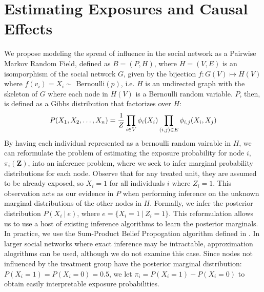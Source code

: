 \documentclass{article}
\begin{document}
\section{Estimating Exposures and Causal Effects}

We propose modeling the spread of influence in the social network as a Pairwise Markov Random Field, defined as $B = (P, H)$, where $H = (V, E)$ is an isomporphism of the social network $G$, given by the bijection $f: G(V) \mapsto H(V)$ where $f(v_i) = X_i \sim $ Bernoulli$(p)$, i.e. $H$ is an undirected graph with the skeleton of $G$ where each node in $H(V)$ is a Bernoulli random variable. 
$P$, then, is defined as a Gibbs distribution that factorizes over $H$: \\
\begin{displaymath}
  P(X_1, X_2, \dots, X_n) = \frac{1}{Z}\prod_{i \in V} \phi_i(X_i)\prod_{(i, j) \in E}\phi_{i,j}(X_i, X_j) \\[0.5ex]
\end{displaymath}
By having each individual represented as a bernoulli random vairable in $H$, we can reformulate the problem of estimating the exposure probability for node $i$,  $\pi_i(\mathbf{Z})$, into 
an inference problem, where we seek to infer marginal probability distributions for each node. Observe that for any treated unit, they are assumed to be already exposed, so $X_i = 1$ for all individuals $i$ where $Z_i = 1$. 
This observation acts as our evidence in $P$ when performing inference on the unknown marginal distributions of the other nodes in $H$. Formally, we infer the posterior distribution $P(X_i\ |\ e)$, where $e = \{X_i = 1\ |\ Z_i = 1\}$. 
This reformulation allows us to use a host of existing inference algorithms to learn the posterior marginals. In practice, we use the Sum-Product Belief Propogation algorithm defined in \cite{koller}. In larger social networks where exact inference may be intractable, 
approximation alogrithms can be used, although we do not examine this case. Since nodes not influenced by the treatment group have the posterior marginal distribution: $P(X_i = 1) = P(X_i = 0) = 0.5$, we let $\pi_i = P(X_i = 1) - P(X_i = 0)$ to obtain easily interpretable exposure probabilities.




\end{document}
